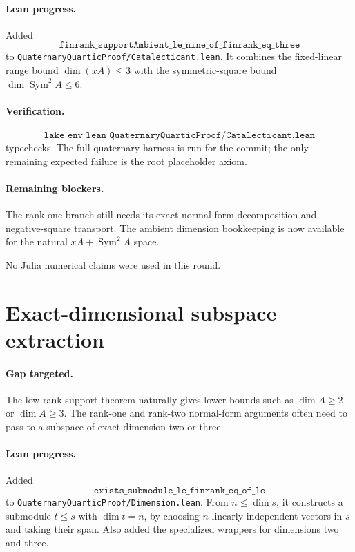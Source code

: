 \documentclass[11pt]{article}
\begin{document}
\paragraph{Lean progress.}
Added
\[
\texttt{finrank\_supportAmbient\_le\_nine\_of\_finrank\_eq\_three}
\]
to \texttt{QuaternaryQuarticProof/Catalecticant.lean}.  It combines the
fixed-linear range bound \(\dim(xA)\le3\) with the symmetric-square bound
\(\dim\operatorname{Sym}^2 A\le6\).

\paragraph{Verification.}
\[
\texttt{lake env lean QuaternaryQuarticProof/Catalecticant.lean}
\]
typechecks.  The full quaternary harness is run for the commit; the only
remaining expected failure is the root placeholder axiom.

\paragraph{Remaining blockers.}
The rank-one branch still needs its exact normal-form decomposition and
negative-square transport.  The ambient dimension bookkeeping is now available
for the natural \(xA+\operatorname{Sym}^2A\) space.

No Julia numerical claims were used in this round.

\section*{Exact-dimensional subspace extraction}

\paragraph{Gap targeted.}
The low-rank support theorem naturally gives lower bounds such as
\(\dim A\ge2\) or \(\dim A\ge3\).  The rank-one and rank-two normal-form
arguments often need to pass to a subspace of exact dimension two or three.

\paragraph{Lean progress.}
Added
\[
\texttt{exists\_submodule\_le\_finrank\_eq\_of\_le}
\]
to \texttt{QuaternaryQuarticProof/Dimension.lean}.  From
\(n\le\dim s\), it constructs a submodule \(t\le s\) with \(\dim t=n\), by
choosing \(n\) linearly independent vectors in \(s\) and taking their span.
Also added the specialized wrappers for dimensions two and three.
\end{document}
